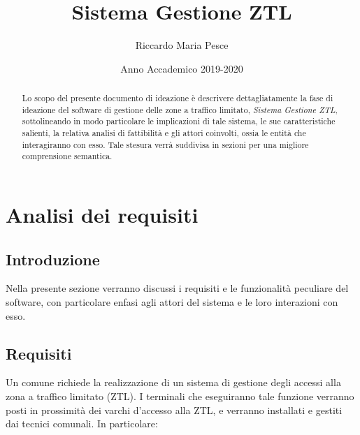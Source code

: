 \documentclass[12pt, letterpaper]{article}
\title{Sistema Gestione ZTL}
\author{Riccardo Maria Pesce}
\date{Anno Accademico 2019-2020}
\begin{document}
\begin{titlepage}

\maketitle

\begin{abstract}

\noindent
Lo scopo del presente documento di ideazione è descrivere dettagliatamente la fase di ideazione del software di gestione delle zone a traffico limitato, \emph{Sistema Gestione ZTL}, sottolineando in modo particolare le implicazioni di tale sistema, le sue caratteristiche salienti, la relativa analisi di fattibilità e gli attori coinvolti, ossia le entità che interagiranno con esso.
\noindent
Tale stesura verrà suddivisa in sezioni per una migliore comprensione semantica.

\end{abstract}
\end{titlepage}

\tableofcontents{}

\pagebreak

\section{Analisi dei requisiti}

\subsection{Introduzione}
Nella presente sezione verranno discussi i requisiti e le funzionalità peculiare del software, con particolare enfasi agli attori del sistema e le loro interazioni con esso.

\subsection{Requisiti}
Un comune richiede la realizzazione di un sistema di gestione degli accessi alla zona a traffico limitato (ZTL). I terminali che eseguiranno tale funzione verranno posti in prossimità dei varchi d'accesso alla ZTL, e verranno installati e gestiti dai tecnici comunali.
In particolare:
\end{document}
